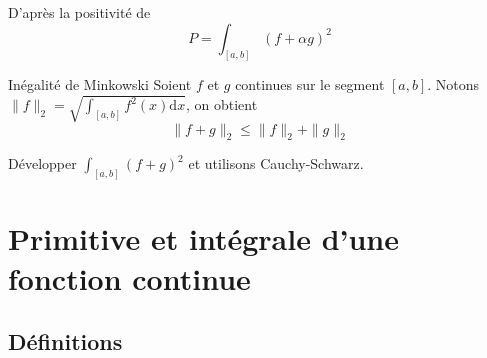 \begin{myproof}{}{}
D'après la positivité de 
\begin{equation}
  P = \int_{[a,b]}^{}(f+\alpha g) ^{2}
\end{equation}
\end{myproof}

\begin{Theorem}{Inégalité de Minkowski}{}
  Soient $f$ et $g$ continues sur le segment $[a,b]$. Notons $\|f \|_2 = \sqrt{\int_{[a,b]}^{}f ^{2}(x) \mathrm{d}x}$, on obtient 
  \begin{equation}
    \| f+g \|_2 \le \| f \|_2 + \| g \|_2
  \end{equation}
\end{Theorem}

\begin{myproof}{}{}
  Développer $\int_{[a,b]}^{}(f+g) ^{2}$ et utilisons Cauchy-Schwarz.
\end{myproof}
































\section{Primitive et intégrale d'une fonction continue} %

\subsection{Définitions} %
\label{sub:Définitions}


